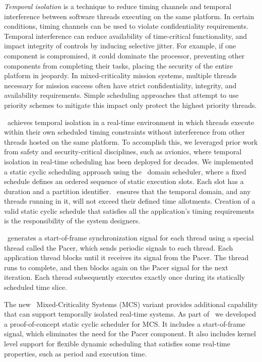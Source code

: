 
\emph{Temporal isolation} is a technique to reduce timing channels and temporal 
interference between software threads executing on the same platform. 
In certain conditions,
timing channels can be used to violate confidentiality requirements. 
Temporal interference can reduce availability of time-critical functionality, 
and impact integrity of controls by inducing selective jitter. 
For example, if one component is compromised, it could dominate the processor, 
preventing other components from completing their tasks, placing the security 
of the entire platform in jeopardy. 
In mixed-criticality mission systems, 
multiple threads necessary for mission success often 
have strict confidentiality, integrity, and availability requirements. 
Simple scheduling approaches that attempt to use priority schemes to mitigate 
this impact only protect the highest priority threads.

\briefcase\ achieves temporal isolation in a real-time
environment in which threads execute within
their own scheduled timing constraints without interference from other
threads hosted on the same platform. To accomplish this, we leveraged
prior work from safety and security-critical disciplines, such as
avionics, where temporal isolation in real-time scheduling has been
deployed for decades. We implemented a static cyclic scheduling
approach using the \selFour\ domain scheduler, where a fixed schedule
defines an ordered sequence of static execution slots. Each slot has a
duration and a partition identifier.  \selFour\ ensures that the
temporal domain, and any threads running in it, will not exceed their defined
time allotments. Creation of a valid static cyclic schedule that
satisfies all the application's timing requirements is the
responsibility of the system designers.

\briefcase\ generates a start-of-frame synchronization signal for each thread using
a special thread called the Pacer, which sends periodic signals
to each thread. Each application thread blocks until it receives its
signal from the Pacer. The thread runs to complete, and then
blocks again on the Pacer signal for the next iteration. 
Each thread subsequently executes
exactly once during its statically scheduled time slice.

The new \selFour\ Mixed-Criticality Systems (MCS) variant provides
additional capability that can support temporally isolated
real-time systems. 
As part of \briefcase\ we developed a proof-of-concept static cyclic
scheduler for MCS.
It includes a start-of-frame signal, which
eliminates the need for the Pacer component. It also includes kernel
level support for flexible dynamic scheduling that satisfies some
real-time properties, such as period and execution time.

